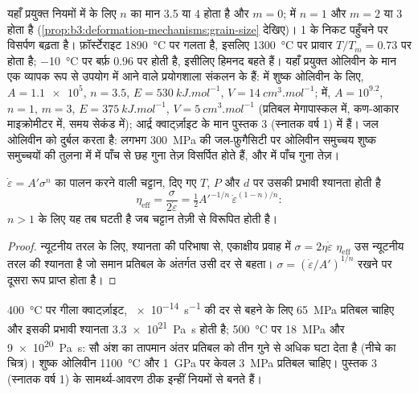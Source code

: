 यहाँ प्रयुक्त नियमों में  के लिए $n$ का मान 3.5 या 4 होता है और $m = 0$;
 में $n = 1$ और $m = 2$ या 3 होता है (\cref{prop:b3:deformation-mechanisms:grain-size} देखिए)।
 1 के निकट पहुँचने पर विसर्पण बढ़ता है। फ़ॉर्स्टेराइट \qty{1890}{\celsius} पर गलता है, इसलिए \qty{1300}{\celsius} पर प्रावार
$T/T_m = 0.73$ पर होता है; \qty{-10}{\celsius} पर बर्फ़ 0.96 पर होती है, इसीलिए
हिमनद बहते हैं। यहाँ प्रयुक्त ओलिवीन के मान एक व्यापक रूप से उपयोग में आने वाले
प्रयोगशाला संकलन के हैं:  में शुष्क ओलिवीन के लिए, $A =
\num{1.1e5}$, $n = 3.5$, $E = \qty{530}{kJ.mol^{-1}}$, $V =
\qty{14}{cm^3.mol^{-1}}$;  में, $A = 10^{9.2}$, $n = 1$, $m = 3$,
$E = \qty{375}{kJ.mol^{-1}}$, $V = \qty{5}{cm^3.mol^{-1}}$ (प्रतिबल मेगापास्कल में,
कण-आकार माइक्रोमीटर में, समय सेकंड में); आर्द्र क्वार्ट्ज़ाइट के मान
पुस्तक 3 (स्नातक वर्ष 1) में हैं। जल ओलिवीन को दुर्बल करता है: लगभग
\qty{300}{MPa} की जल-फ़ुगैसिटी पर ओलिवीन समुच्चय शुष्क समुच्चयों की तुलना में
 में पाँच से छह गुना तेज़ विसर्पित होते हैं, और  में पाँच गुना तेज़।

\begin{proposition}[प्रभावी श्यानता]\label{prop:b3:deformation-mechanisms:viscosity}
 $\dot\varepsilon = A'\sigma^n$ का पालन करने वाली चट्टान, दिए गए $T$, $P$ और
$d$ पर उसकी प्रभावी श्यानता होती है
\[
  \eta_{\mathrm{eff}} = \frac{\sigma}{2\dot\varepsilon}
  = \tfrac12A'^{-1/n}\,\dot\varepsilon^{(1-n)/n}:
\]
$n > 1$ के लिए यह तब घटती है जब चट्टान तेज़ी से विरूपित होती है।
\end{proposition}

\begin{proof}
न्यूटनीय तरल के लिए, श्यानता की परिभाषा से, एकाक्षीय प्रवाह में $\sigma = 2\eta\dot\varepsilon$
$\eta_{\mathrm{eff}}$ उस न्यूटनीय तरल की श्यानता है जो समान प्रतिबल के
अंतर्गत उसी दर से बहता।
$\sigma = (\dot\varepsilon/A')^{1/n}$ रखने पर दूसरा रूप प्राप्त होता है।
\end{proof}

\qty{400}{\celsius} पर गीला क्वार्ट्ज़ाइट, \qty{e-14}{s^{-1}} की दर से बहने के लिए
\qty{65}{MPa} प्रतिबल चाहिए और इसकी प्रभावी श्यानता \qty{3.3e21}{Pa.s} होती है;
\qty{500}{\celsius} पर \qty{18}{MPa} और \qty{9e20}{Pa.s}: सौ अंश का तापमान अंतर
प्रतिबल को तीन गुने से अधिक घटा देता है (नीचे का चित्र)। शुष्क ओलिवीन
\qty{1100}{\celsius} और \qty{1}{GPa} पर केवल \qty{3}{MPa} प्रतिबल चाहिए।
पुस्तक 3 (स्नातक वर्ष 1) के सामर्थ्य-आवरण ठीक इन्हीं नियमों से बनते हैं।

